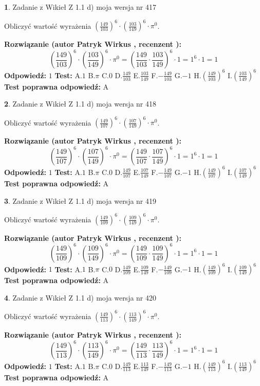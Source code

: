 \documentclass[12pt, a4paper]{article}
\theoremstyle{definition} %
\newtheorem{zad}{}
\newcommand{\zadStart}[1]{\begin{zad}#1\newline}
\newcommand{\zadStop}{\end{zad}}
\newcommand{\rozwStart}[2]{\noindent \textbf{Rozwiązanie (autor #1 , recenzent #2): }\newline}
\newcommand{\rozwStop}{\newline}
\newcommand{\odpStart}{\noindent \textbf{Odpowiedź:}\newline}
\newcommand{\odpStop}{\newline}
\newcommand{\testStart}{\noindent \textbf{Test:}\newline}
\newcommand{\testStop}{\newline}
\newcommand{\kluczStart}{\noindent \textbf{Test poprawna odpowiedź:}\newline}
\newcommand{\kluczStop}{\newline}
\begin{document}
\zadStart{Zadanie z Wikieł Z 1.1 d) moja wersja nr 417}

Obliczyć wartość wyrażenia $(\frac{149}{103})^{6} \cdot (\frac{103}{149})^{6} \cdot \pi^{0}$.
\zadStop
\rozwStart{Patryk Wirkus}{}
$$(\frac{149}{103})^{6} \cdot (\frac{103}{149})^{6} \cdot \pi^{0} = (\frac{149}{103} \cdot \frac{103}{149})^{6} \cdot 1 = 1^{6} \cdot 1 = 1$$
\rozwStop
\odpStart
$1$
\odpStop
\testStart
A.$1$ B.$\pi$ C.$0$ D.$\frac{149}{103}$ E.$\frac{103}{149}$
F.$-\frac{149}{103}$ G.$-1$
H.$(\frac{149}{103})^{6}$
I.$(\frac{103}{149})^{6}$
\testStop
\kluczStart
A
\kluczStop



\zadStart{Zadanie z Wikieł Z 1.1 d) moja wersja nr 418}

Obliczyć wartość wyrażenia $(\frac{149}{107})^{6} \cdot (\frac{107}{149})^{6} \cdot \pi^{0}$.
\zadStop
\rozwStart{Patryk Wirkus}{}
$$(\frac{149}{107})^{6} \cdot (\frac{107}{149})^{6} \cdot \pi^{0} = (\frac{149}{107} \cdot \frac{107}{149})^{6} \cdot 1 = 1^{6} \cdot 1 = 1$$
\rozwStop
\odpStart
$1$
\odpStop
\testStart
A.$1$ B.$\pi$ C.$0$ D.$\frac{149}{107}$ E.$\frac{107}{149}$
F.$-\frac{149}{107}$ G.$-1$
H.$(\frac{149}{107})^{6}$
I.$(\frac{107}{149})^{6}$
\testStop
\kluczStart
A
\kluczStop



\zadStart{Zadanie z Wikieł Z 1.1 d) moja wersja nr 419}

Obliczyć wartość wyrażenia $(\frac{149}{109})^{6} \cdot (\frac{109}{149})^{6} \cdot \pi^{0}$.
\zadStop
\rozwStart{Patryk Wirkus}{}
$$(\frac{149}{109})^{6} \cdot (\frac{109}{149})^{6} \cdot \pi^{0} = (\frac{149}{109} \cdot \frac{109}{149})^{6} \cdot 1 = 1^{6} \cdot 1 = 1$$
\rozwStop
\odpStart
$1$
\odpStop
\testStart
A.$1$ B.$\pi$ C.$0$ D.$\frac{149}{109}$ E.$\frac{109}{149}$
F.$-\frac{149}{109}$ G.$-1$
H.$(\frac{149}{109})^{6}$
I.$(\frac{109}{149})^{6}$
\testStop
\kluczStart
A
\kluczStop



\zadStart{Zadanie z Wikieł Z 1.1 d) moja wersja nr 420}

Obliczyć wartość wyrażenia $(\frac{149}{113})^{6} \cdot (\frac{113}{149})^{6} \cdot \pi^{0}$.
\zadStop
\rozwStart{Patryk Wirkus}{}
$$(\frac{149}{113})^{6} \cdot (\frac{113}{149})^{6} \cdot \pi^{0} = (\frac{149}{113} \cdot \frac{113}{149})^{6} \cdot 1 = 1^{6} \cdot 1 = 1$$
\rozwStop
\odpStart
$1$
\odpStop
\testStart
A.$1$ B.$\pi$ C.$0$ D.$\frac{149}{113}$ E.$\frac{113}{149}$
F.$-\frac{149}{113}$ G.$-1$
H.$(\frac{149}{113})^{6}$
I.$(\frac{113}{149})^{6}$
\testStop
\kluczStart
A
\kluczStop
\end{document}
